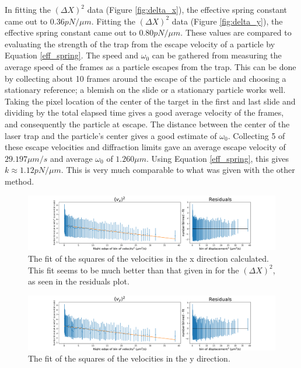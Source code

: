 \documentclass[12pt]{article}
\begin{document}
In fitting the $(\Delta X)^2$ data (Figure \ref{fig:delta_x}), the effective spring constant came out to $0.36pN/\mu m$. Fitting the $(\Delta X)^2$ data (Figure \ref{fig:delta_y}), the effective spring constant came out to $0.80pN/\mu m$. These values are compared to evaluating the strength of the trap from the escape velocity of a particle by Equation \ref{eff_spring}. The speed and $\omega_0$ can be gathered from measuring the average speed of the frames as a particle escapes from the trap. This can be done by collecting about 10 frames around the escape of the particle and choosing a stationary reference; a blemish on the slide or a stationary particle works well. Taking the pixel location of the center of the target in the first and last slide and dividing by the total elapsed time gives a good average velocity of the frames, and consequently the particle at escape. The distance between the center of the laser trap and the particle's center gives a good estimate of $\omega_0$. Collecting 5 of these escape velocities and diffraction limits gave an average escape velocity of $29.197 \mu m/s$ and average $\omega_0$ of $1.260 \mu m$. Using Equation \ref{eff_spring}, this gives $k \approx 1.12 pN / \mu m$. This is very much comparable to what was given with the other method. 


\begin{figure}
\centering
    \includegraphics[width=\textwidth]{v_x.pdf}
	\caption{The fit of the squares of the velocities in the x direction calculated. This fit seems to be much better than that given in for the $(\Delta X)^2$, as seen in the residuals plot.}
    \label{fig:v_x}
\end{figure} %
\begin{figure}
\centering
    \includegraphics[width=\textwidth]{v_y.pdf}
	\caption{The fit of the squares of the velocities in the y direction.}
    \label{fig:v_y}
\end{figure} %
\end{document}
